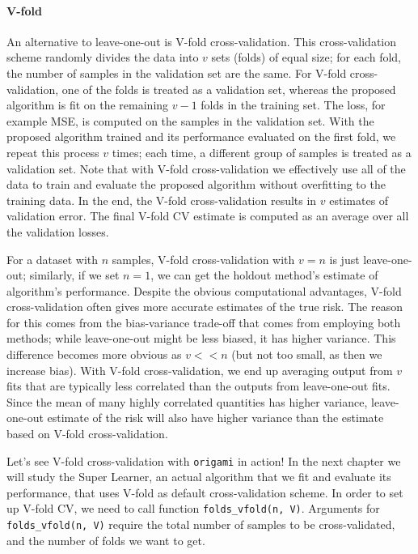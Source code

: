 \documentclass[12pt, krantz2,]{krantz}
\let\oldparagraph\paragraph
\renewcommand{\paragraph}[1]{\oldparagraph{#1}\mbox{}}
\theoremstyle{definition}
\theoremstyle{definition}
\theoremstyle{definition}
\newcommand{\1}{\mathbbm{1}}
\begin{document}
\hypertarget{v-fold}{%
\paragraph{V-fold}\label{v-fold}}

An alternative to leave-one-out is V-fold cross-validation. This
cross-validation scheme randomly divides the data into \(v\) sets (folds) of equal
size; for each fold, the number of samples in the validation set are the same.
For V-fold cross-validation, one of the folds is treated as a validation set,
whereas the proposed algorithm is fit on the remaining \(v-1\) folds in the
training set. The loss, for example MSE, is computed on the samples in the
validation set. With the proposed algorithm trained and its performance
evaluated on the first fold, we repeat this process \(v\) times; each time, a
different group of samples is treated as a validation set. Note that with V-fold
cross-validation we effectively use all of the data to train and evaluate the
proposed algorithm without overfitting to the training data. In the end, the
V-fold cross-validation results in \(v\) estimates of validation error. The final
V-fold CV estimate is computed as an average over all the validation losses.

For a dataset with \(n\) samples, V-fold cross-validation with \(v=n\) is just
leave-one-out; similarly, if we set \(n=1\), we can get the holdout method's
estimate of algorithm's performance. Despite the obvious computational
advantages, V-fold cross-validation often gives more accurate estimates of the
true risk. The reason for this comes from the bias-variance trade-off that comes
from employing both methods; while leave-one-out might be less biased, it has
higher variance. This difference becomes more obvious as \(v<<n\) (but not too
small, as then we increase bias). With V-fold cross-validation, we end up
averaging output from \(v\) fits that are typically less correlated than the
outputs from leave-one-out fits. Since the mean of many highly correlated
quantities has higher variance, leave-one-out estimate of the risk will also
have higher variance than the estimate based on V-fold cross-validation.

Let's see V-fold cross-validation with \texttt{origami} in action! In the next chapter
we will study the Super Learner, an actual algorithm that we fit and evaluate
its performance, that uses V-fold as default cross-validation scheme. In order
to set up V-fold CV, we need to call function \texttt{folds\_vfold(n,\ V)}. Arguments
for \texttt{folds\_vfold(n,\ V)} require the total number of samples to be
cross-validated, and the number of folds we want to get.
\end{document}
